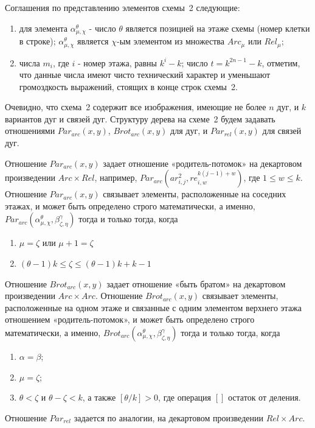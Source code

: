 Соглашения по представлению элементов схемы~2 следующие:
\begin{enumerate}
\item для элемента $\alpha_{\mu,\chi}^\theta$ - число $\theta$ является позицией на этаже схемы (номер клетки в строке); $\alpha_{\mu,\chi}^\theta$ является $\chi$-ым элементом из множества $Arc_{\mu}$ или $Rel_{\mu}$;
\item числа $m_i$, где $i$ - номер этажа, равны $k^i - k$; число $t = k^{2n-1}-k$, отметим, что данные числа имеют чисто технический характер и уменьшают громоздкость выражений, стоящих в конце строк схемы~2.
\end{enumerate}

Очевидно, что схема~2 содержит все изображения, имеющие не более $n$ дуг, и $k$ 
вариантов дуг и связей дуг. 
Структуру дерева на схеме~2 будем задавать отношениями 
$Par_{arc}(x,y)$, $Brot_{arc}(x,y)$ для дуг, и $Par_{rel}(x,y)$ для связей дуг.

Отношение $Par_{arc}(x,y)$ задает отношение «родитель-потомок» на 
декартовом произведении $Arc \times Rel$,
например, $Par_{arc}(ar_{i,j}^2, re_{i,w}^{k(j-1)+w})$, где $1 \le w 
\le k$. Отношение $Par_{arc}(x,y)$ связывает элементы, расположенные на 
соседних этажах, и может быть определено строго математически, а именно, 
$Par_{arc}(\alpha_{\mu,\chi}^\theta, \beta_{\zeta,\eta}^\gamma)$ тогда и только 
тогда, когда 
\begin{enumerate}
\item $\mu=\zeta$ или $\mu + 1 =\zeta$
\item $(\theta - 1)k \leq \zeta \leq (\theta - 1)k + k-1$
\end{enumerate}
Отношение $Brot_{arc}(x,y)$ задает отношение «быть братом» на 
декартовом произведении $Arc \times Arc$.
Отношение  $Brot_{arc}(x,y)$  связывает элементы, расположенные на одном этаже 
и связанные с одним элементом верхнего этажа отношением «ро\-ди\-тель-потомок», 
и может быть определено строго математически, а именно, 
$Brot_{arc}(\alpha_{\mu,\chi}^\theta, \beta_{\zeta,\eta}^\gamma)$ тогда и 
только тогда, когда
\begin{enumerate}
\item $\alpha=\beta$;
\item $\mu=\zeta$;
\item $\theta < \zeta$ и $\theta-\zeta<k$, а также $[\theta / k ]>0$, где 
операция $[ ]$ остаток от деления.
\end{enumerate}
Отношение $Par_{rel}$ задается по аналогии, на декартовом 
произведении $Rel \times Arc$.

